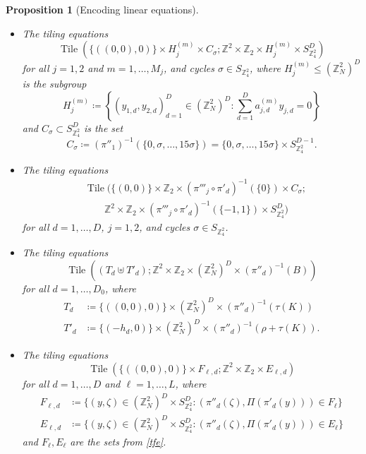 \documentclass[reqno,a4paper,12pt]{amsart}
\numberwithin{equation}{section}
\numberwithin{figure}{section}
\def\Z{\mathbb{Z}}
\renewcommand\leq{\leqslant}
\newcommand{\Tile}{\operatorname{Tile}}
\theoremstyle{plain}
\newtheorem{proposition}[thm]{Proposition}
\theoremstyle{definition}
\begin{document}
\begin{proposition}[Encoding linear equations]
\begin{itemize}
\begin{itemize}
    \item[1. ] The tiling equations \begin{equation}\label{bigtile-1}
 \Tile( \{((0,0),0)\} \times H_j^{(m)} \times C_\sigma  ; \Z^2 \times \Z_2 \times H_j^{(m)} \times S_{\Z_4^2}^{D} )
\end{equation}
for all $j=1,2$ and $m=1,\dots,M_j$, and cycles $\sigma \in S_{\Z_4^2}$, where $H_j^{(m)} \leq (\Z_N^2)^D$ is the subgroup
\begin{equation}\label{hjm}
H_{j}^{(m)} \coloneqq \left\{ (y_{1,d},y_{2,d})_{d=1}^D \in (\Z_N^2)^D: \sum_{d=1}^D a_{j,d}^{(m)} y_{j,d} = 0 \right\}
\end{equation}
and $C_\sigma \subset S_{\Z_4^2}^{D}$ is the set
$$ C_\sigma \coloneqq (\pi''_1)^{-1}(\{0, \sigma, \dots, 15 \sigma \}) = \{0, \sigma, \dots, 15 \sigma \} \times S_{\Z_4^2}^{D-1}.$$
\item[2. ] The  tiling equations
\begin{equation}\label{bigtile-2}
\begin{split}
&\Tile( \{(0,0)\} \times \Z_2 \times (\pi'''_j \circ \pi'_d)^{-1}(\{0\}) \times C_\sigma  ; \\
&\quad\quad \Z^2 \times \Z_2 \times (\pi'''_j \circ \pi'_d)^{-1}(\{-1,1\}) \times S_{\Z_4^2}^{D} )
\end{split}
\end{equation}
for all $d=1,\dots,D$, $j=1,2$, and cycles $\sigma \in S_{\Z_4^2}$. 
\item[3. ] The  tiling equations
\begin{equation}\label{bigtile-3}
\Tile( (T_d \uplus T'_d)  ; \Z^2 \times \Z_2 \times (\Z_N^2)^D \times (\pi''_d)^{-1}(B) )
\end{equation}
for all $d=1,\dots,D_0$, where 
\begin{align*}
T_d &\coloneqq
\{ ((0,0), 0)\} \times (\Z_N^2)^D \times (\pi''_d)^{-1}(\tau(K))\\
T'_d &\coloneqq \{(-h_d,0)\} \times (\Z_N^2)^D \times (\pi''_d)^{-1}(\rho + \tau(K)).
\end{align*}
\item[4. ] The  tiling equations
\begin{equation}\label{bigtile-4}
\Tile( \{((0,0),0)\} \times F_{\ell,d}  ; \Z^2 \times \Z_2 \times  E_{\ell,d} )
\end{equation}
for all $d=1,\dots,D$ and $\ell=1,\dots,L$, where
\begin{align*}
F_{\ell,d} &\coloneqq \{ (y,\zeta) \in (\Z_N^2)^D \times S_{\Z_4^2}^{D}: (\pi''_d(\zeta), \Pi(\pi'_d(y))) \in F_\ell \} \\
E_{\ell,d} &\coloneqq \{ (y,\zeta) \in (\Z_N^2)^D \times S_{\Z_4^2}^{D}: (\pi''_d(\zeta), \Pi(\pi'_d(y))) \in E_\ell \}
\end{align*}
and $F_\ell, E_\ell$ are the sets from \eqref{tfe}.
\end{itemize}
\end{itemize}
\end{proposition}
\end{document}
